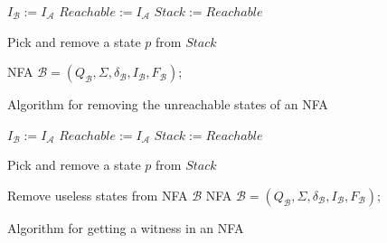 \begin{figure}[h!]
\begin{algorithm}[H]
	\label{algRemove}

  $I_{\mathcal{B}} := I_{\mathcal{A}}$\;
  $Reachable := I_\mathcal{A}$\;
  $Stack := Reachable$\;
	
   {
			Pick and remove a state $p$ from $Stack$\;
	 }

	\Return NFA $\mathcal{B}=(Q_\mathcal{B},\Sigma,\delta_\mathcal{B},I_\mathcal{B},F_\mathcal{B})$;
	\caption{Algorithm for removing the unreachable states of an NFA}
\end{algorithm}
\begin{algorithm}[H]
	\label{algCandidate}


  $I_\mathcal{B} := I_\mathcal{A}$\;
  $Reachable := I_\mathcal{A}$\;
  $Stack := Reachable$\;
	
   {
			Pick and remove a state $p$ from $Stack$\;
	}

  Remove useless states from NFA $\mathcal{B}$\;
	\Return NFA $\mathcal{B}=(Q_\mathcal{B},\Sigma,\delta_\mathcal{B},I_\mathcal{B},F_\mathcal{B})$;
	\caption{Algorithm for getting a witness in an NFA}
\end{algorithm}


\end{figure}

